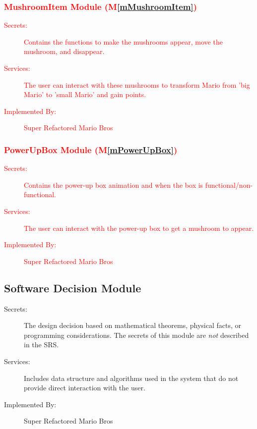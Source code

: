 \documentclass[12pt, titlepage]{article}
\newcommand{\mref}[1]{M\ref{#1}}
\begin{document}
\subsubsection{\textcolor{red}{MushroomItem Module (\mref{mMushroomItem})}}

\begin{description}
\item[\textcolor{red}{Secrets:}] \textcolor{red}{Contains the functions to make the mushrooms appear, move the mushroom, and disappear.}
\item[\textcolor{red}{Services:}] \textcolor{red}{The user can interact with these mushrooms to transform Mario from 'big Mario' to 'small Mario' and gain points.}
\item[\textcolor{red}{Implemented By:}] \textcolor{red}{Super Refactored Mario Bros}
\end{description}

\subsubsection{\textcolor{red}{PowerUpBox Module (\mref{mPowerUpBox})}}

\begin{description}
\item[\textcolor{red}{Secrets:}] \textcolor{red}{Contains the power-up box animation and when the box is functional/non-functional.}
\item[\textcolor{red}{Services:}] \textcolor{red}{The user can interact with the power-up box to get a mushroom to appear.}
\item[\textcolor{red}{Implemented By:}] \textcolor{red}{Super Refactored Mario Bros}
\end{description}

\subsection{Software Decision Module}

\begin{description}
\item[Secrets:] The design decision based on mathematical theorems, physical
  facts, or programming considerations. The secrets of this module are
  \emph{not} described in the SRS.
\item[Services:] Includes data structure and algorithms used in the system that
  do not provide direct interaction with the user. 
\item[Implemented By:] Super Refactored Mario Bros
\end{description}
\end{document}
